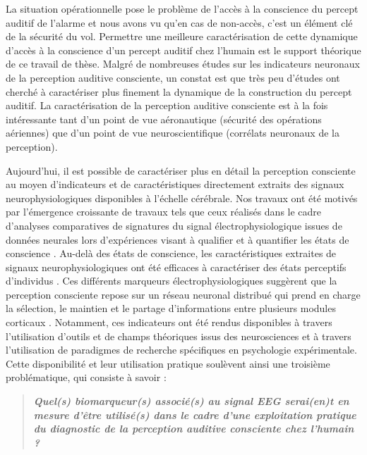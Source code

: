 La situation opérationnelle pose le problème de l'accès à la conscience du percept auditif de l'alarme et nous avons vu qu'en cas de non-accès, c'est un élément clé de la sécurité du vol. 
Permettre une meilleure caractérisation de cette dynamique d'accès à la conscience d'un percept auditif chez l'humain est le support théorique de ce travail de thèse.
Malgré de nombreuses études sur les indicateurs neuronaux de la perception auditive consciente, un constat est que très peu d'études ont cherché à caractériser plus finement la dynamique de la construction du percept auditif. 
La caractérisation de la perception auditive consciente est à la fois intéressante tant d'un point de vue aéronautique (sécurité des opérations aériennes) que d'un point de vue neuroscientifique (corrélats neuronaux de la perception). 

Aujourd'hui, il est possible de caractériser plus en détail la perception consciente au moyen d'indicateurs et de caractéristiques directement extraits des signaux neurophysiologiques disponibles à l'échelle cérébrale.
Nos travaux ont été motivés par l'émergence croissante de travaux tels que ceux réalisés dans le cadre d'analyses comparatives de signatures du signal électrophysiologique issues de données neurales lors d'expériences visant à qualifier et à quantifier les états de conscience \citep{curley2018characterization, engemann2018robust, engemann2020combining, king2014characterizingthesis, liang2015eeg, sitt2014large}. 
Au-delà des états de conscience, les caractéristiques extraites de signaux neurophysiologiques ont été efficaces à caractériser des états perceptifs d'individus \citep{curtu2019neural, fishman2021learning, higgins2020neural, roy2016efficient, roy2020can}. 
Ces différents marqueurs électrophysiologiques suggèrent que la perception consciente repose sur un réseau neuronal distribué qui prend en charge la sélection, le maintien et le partage d'informations entre plusieurs modules corticaux \citep{king2014characterizingthesis}. 
Notamment, ces indicateurs ont été rendus disponibles à travers l'utilisation d'outils et de champs théoriques issus des neurosciences et à travers l'utilisation de paradigmes de recherche spécifiques en psychologie expérimentale. 
Cette disponibilité et leur utilisation pratique soulèvent ainsi une troisième problématique, qui consiste à savoir :
\begin{quote}
\textit{\textbf{Quel(s) biomarqueur(s) associé(s) au signal EEG serai(en)t en mesure d'être utilisé(s) dans le cadre d'une exploitation pratique du diagnostic de la perception auditive consciente chez l'humain ?}}
\end{quote}

